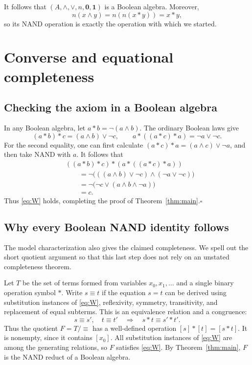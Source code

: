 \documentclass[11pt,a4paper]{article}
\newcommand{\one}{\mathbf{1}}
\newcommand{\zero}{\mathbf{0}}
\begin{document}
It follows that $(A,\wedge,\vee,n,\zero,\one)$ is a Boolean algebra.
Moreover,
\[
 n(x\wedge y)=n(n(x*y))=x*y,
\]
so its NAND operation is exactly the operation with which we started.

\section{Converse and equational completeness}\label{sec:complete}
\subsection{Checking the axiom in a Boolean algebra}
In any Boolean algebra, let $a*b=\neg(a\wedge b)$.
The ordinary Boolean laws give
\[
 (a*b)*c=(a\wedge b)\vee\neg c,
 \qquad
 a*((a*c)*a)=\neg a\vee\neg c.
\]
For the second equality, one can first calculate
$(a*c)*a=(a\wedge c)\vee\neg a$, and then take NAND with $a$.
It follows that
\[
 \begin{aligned}
 &((a*b)*c)*(a*((a*c)*a))\\
 &\qquad=\neg\bigl(((a\wedge b)\vee\neg c)
                    \wedge(\neg a\vee\neg c)\bigr)\\
 &\qquad=\neg\bigl(\neg c\vee(a\wedge b\wedge\neg a)\bigr)\\
 &\qquad=c.
 \end{aligned}
\]
Thus \eqref{eq:W} holds, completing the proof of
Theorem~\ref{thm:main}.\hfill$\square$

\subsection{Why every Boolean NAND identity follows}
The model characterization also gives the claimed completeness. We spell
out the short quotient argument so that this last step does not rely on
an unstated completeness theorem.

Let $T$ be the set of terms formed from variables $x_0,x_1,\ldots$ and a
single binary operation symbol $*$. Write $s\equiv t$ if the equation
$s=t$ can be derived using substitution instances of \eqref{eq:W},
reflexivity, symmetry, transitivity, and replacement of equal subterms.
This is an equivalence relation and a congruence:
\[
 s\equiv s',\quad t\equiv t'
 \quad\Longrightarrow\quad
 s*t\equiv s'*t'.
\]
Thus the quotient $F=T/{\equiv}$ has a well-defined operation
$[s]*[t]=[s*t]$. It is nonempty, since it contains $[x_0]$.
All substitution instances of \eqref{eq:W} are among the generating
relations, so $F$ satisfies \eqref{eq:W}. By
Theorem~\ref{thm:main}, $F$ is the NAND reduct of a Boolean algebra.
\end{document}
